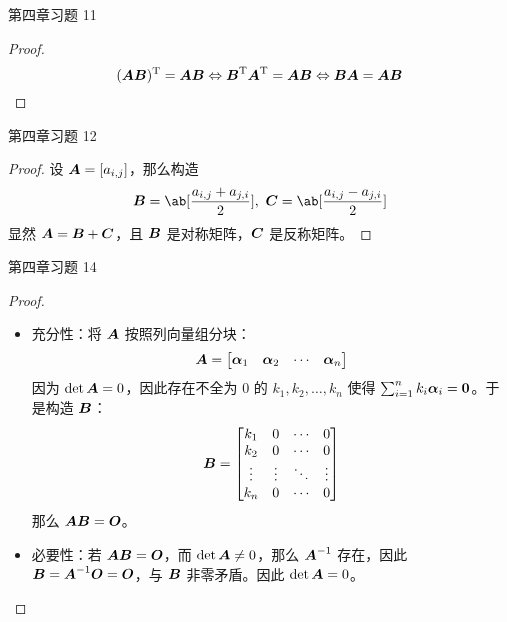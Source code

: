 \begin{problem}
	第四章习题 11

	\begin{proof}
		$$
		(\boldsymbol{A} \boldsymbol{B})^\mathrm{T} = \boldsymbol{A} \boldsymbol{B} \Leftrightarrow \boldsymbol{B}^\mathrm{T} \boldsymbol{A}^\mathrm{T} = \boldsymbol{A} \boldsymbol{B} \Leftrightarrow \boldsymbol{B} \boldsymbol{A} = \boldsymbol{A} \boldsymbol{B}
		$$
	\end{proof}
\end{problem}

\begin{problem}
	第四章习题 12

	\begin{proof}
		设 $\boldsymbol{A} = [a_{i,j}]$，那么构造
		$$
		\matr{B} = \ab[\frac{a_{i,j} + a_{j,i}}{2}],\ \matr{C} = \ab[\frac{a_{i,j} - a_{j,i}}{2}]
		$$
		显然 $\boldsymbol{A} = \boldsymbol{B} + \boldsymbol{C}$，且 $\boldsymbol{B}$ 是对称矩阵，$\boldsymbol{C}$ 是反称矩阵。
	\end{proof}
\end{problem}

\begin{problem}
	第四章习题 14

	\begin{proof}
		\begin{itemize}
			\item 充分性：将 $\boldsymbol{A}$ 按照列向量组分块：
			$$
			\boldsymbol{A} = \begin{bmatrix}
				\boldsymbol{\alpha}_1 & \boldsymbol{\alpha}_2 & \cdots & \boldsymbol{\alpha}_n
			\end{bmatrix}
			$$
			因为 $\det \boldsymbol{A} = 0$，因此存在不全为 $0$ 的 $k_1, k_2, \dots, k_n$ 使得 $\sum_{i=1}^n k_i \boldsymbol{\alpha}_i = \boldsymbol{0}$。于是构造 $\boldsymbol{B}$：
			$$
			\boldsymbol{B} = \begin{bmatrix}
				k_1 & 0 & \cdots & 0 \\
				k_2 & 0 & \cdots & 0 \\
				\vdots & \vdots & \ddots & \vdots \\
				k_n & 0 & \cdots & 0
			\end{bmatrix}
			$$
			那么 $\boldsymbol{A} \boldsymbol{B} = \boldsymbol{O}$。

			\item 必要性：若 $\boldsymbol{A} \boldsymbol{B} = \boldsymbol{O}$，而 $\det \boldsymbol{A} \neq 0$，那么 $\boldsymbol{A}^{-1}$ 存在，因此 $\boldsymbol{B} = \boldsymbol{A}^{-1} \boldsymbol{O} = \boldsymbol{O}$，与 $\boldsymbol{B}$ 非零矛盾。因此 $\det \boldsymbol{A} = 0$。
		\end{itemize}
	\end{proof}
\end{problem}

